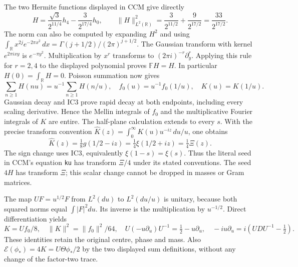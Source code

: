 \documentclass[11pt]{article}
\newcommand{\R}{\mathbb R}\newcommand{\C}{\mathbb C}
\begin{document}
The two Hermite functions displayed in CCM give directly
\begin{equation}\tag{IC2}
 H=\frac{\sqrt3}{2^{11/4}}h_4-\frac3{2^{17/4}}h_0,
 \qquad \|H\|_{L^2(\R)}^2=\frac3{2^{11/2}}+\frac9{2^{17/2}}
 =\frac{33}{2^{17/2}}.
\end{equation}
The norm can also be computed by expanding $H^2$ and using
$\int_{\R}x^{2j}e^{-2\pi x^2}\,dx
=\Gamma(j+1/2)/(2\pi)^{j+1/2}$.
The Gaussian transform with kernel $e^{2\pi ixy}$ is
$e^{-\pi y^2}$. Multiplication by $x^r$ transforms to
$(2\pi i)^{-r}\partial_y^r$. Applying this rule for $r=2,4$
to the displayed polynomial proves $\mathbb FH=H$.
In particular $H(0)=\int_\R H=0$. Poisson summation now gives
\begin{equation}\tag{IC3}
 \sum_{n\ge1}H(nu)=u^{-1}\sum_{n\ge1}H(n/u),
 \quad f_0(u)=u^{-1}f_0(1/u),\quad K(u)=K(1/u).
\end{equation}
Gaussian decay and IC3 prove rapid decay at both endpoints,
including every scaling derivative. Hence the Mellin integrals
of $f_0$ and the multiplicative Fourier integrals of $K$ are entire.
The half-plane calculation extends to every $s$.
With the precise transform convention
$\widehat K(z)=\int_0^\infty K(u)u^{-iz}\,du/u$, one obtains
\begin{equation}\tag{IC4}
 \widehat K(z)=\tfrac18g(1/2-iz)
 =\tfrac14\xi(1/2+iz)=\tfrac14\Xi(z).
\end{equation}
The sign change uses IC3, equivalently $\xi(1-s)=\xi(s)$.
Thus the literal seed in CCM's equation \texttt{ku} has transform
$\Xi/4$ under its stated conventions. The seed $4H$ has transform
$\Xi$; this scalar change cannot be dropped in masses or Gram matrices.

The map $UF=u^{1/2}F$ from $L^2(du)$ to $L^2(du/u)$ is unitary,
because both squared norms equal $\int|F|^2du$. Its inverse is
the multiplication by $u^{-1/2}$. Direct differentiation yields
\begin{equation}\tag{IC5}
 K=Uf_0/8,\quad \|K\|^2=\|f_0\|^2/64,\quad
 U(-u\partial_u)U^{-1}=\tfrac12-u\partial_u,
 \quad -iu\partial_u=i(U D U^{-1}-\tfrac12).
\end{equation}
These identities retain the original centre, phase and mass.
Also $\mathcal E(\phi_*)=4K=U\Theta\phi_*/2$ by the two displayed
sum definitions, without any change of the factor-two trace.
\end{document}

